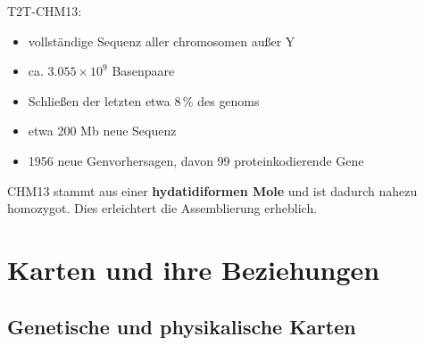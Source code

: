 T2T-CHM13:

\begin{itemize}
    \item vollständige Sequenz aller \gls{chromosom}en außer Y
    \item ca. $3.055 \times 10^9$ Basenpaare
    \item Schließen der letzten etwa 8\,\% des \gls{genom}s
    \item etwa 200 Mb neue Sequenz
    \item 1956 neue Genvorhersagen,
    davon 99 proteinkodierende Gene
\end{itemize}


\begin{bem}
    CHM13 stammt aus einer
    \textbf{hydatidiformen Mole} und ist dadurch nahezu homozygot.
    Dies erleichtert die Assemblierung erheblich.
\end{bem}




\section{Karten und ihre Beziehungen}\label{sec:karten-und-ihre-beziehungen}

\subsection*{Genetische und physikalische Karten}\label{subsec:genetische-und-physikalische-karten}


